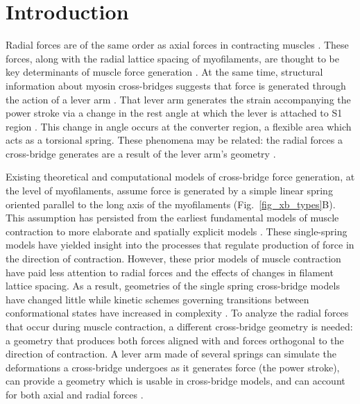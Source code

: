 \documentclass[11pt,titlepage]{article}
\begin{document}
\section*{Introduction} %

Radial forces are of the same order as axial forces in contracting muscles \citep{Maughan1981, Cecchi1990, Millman1998}. 
These forces, along with the radial lattice spacing of myofilaments, are thought to be key determinants of muscle force generation \citep{Fuchs2005}. 
At the same time, structural information about myosin cross-bridges suggests that force is generated through the action of a lever arm \citep{Rayment1993, Uyeda1996, Huxley2000}.
That lever arm generates the strain accompanying the power stroke via a change in the rest angle at which the lever is attached to S1 region \citep{Huxley2000, Houdusse2001}. 
This change in angle occurs at the converter region, a flexible area which acts as a torsional spring. 
These phenomena may be related: the radial forces a cross-bridge generates are a result of the lever arm's geometry \citep{Schoenberg1980b}. 

Existing theoretical and computational models of cross-bridge force generation, at the level of myofilaments, assume force is generated by a simple linear spring oriented parallel to the long axis of the myofilaments (Fig.~\ref{fig_xb_types}B). 
This assumption has persisted from the earliest fundamental models of muscle contraction to more elaborate and spatially explicit models \citep{Huxley1957, Daniel1998, Chase2004, Tanner2007, Campbell2009}.  
These single-spring models have yielded insight into the processes that regulate production of force in the direction of contraction.
However, these prior models of muscle contraction have paid less attention to radial forces and the effects of changes in filament lattice spacing. 
As a result, geometries of the single spring cross-bridge models have changed little while kinetic schemes governing transitions between conformational states have increased in complexity \citep{Huxley1957, Pate1989, Daniel1998, Smith2008a}. 
To analyze the radial forces that occur during muscle contraction, a different cross-bridge geometry is needed: a geometry that produces both forces aligned with and forces orthogonal to the direction of contraction. 
A lever arm made of several springs can simulate the deformations a cross-bridge undergoes as it generates force (the power stroke), can provide a geometry which is usable in cross-bridge models, and can account for both axial and radial forces \citep{Houdusse2001}.  
\end{document}
